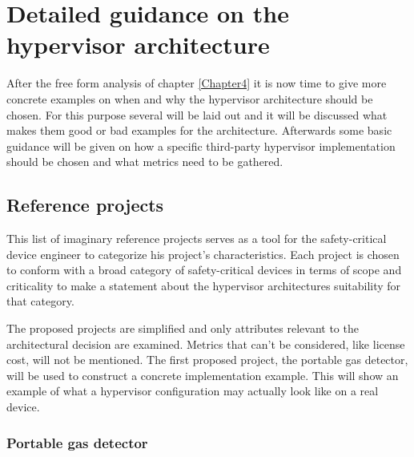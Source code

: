 
\chapter{Detailed guidance on the hypervisor architecture} %

\label{Chapter5} %



After the free form analysis of chapter \ref{Chapter4} it is now time to give more concrete examples on when and why the hypervisor architecture should be chosen. For this purpose several  will be laid out and it will be discussed what makes them good or bad examples for the architecture. Afterwards some basic guidance will be given on how a specific third-party hypervisor implementation should be chosen and what metrics need to be gathered.
\section{Reference projects} \label{ref-projects}
This list of imaginary reference projects serves as a tool for the safety-critical device engineer to categorize his project's characteristics. Each project is chosen to conform with a broad category of safety-critical devices in terms of scope and criticality to make a statement about the hypervisor architectures suitability for that category. 

The proposed projects are simplified and only attributes relevant to the architectural decision are examined. Metrics that can't be considered, like license cost, will not be mentioned. The first proposed project, the portable gas detector, will be used to construct a concrete implementation example. This will show an example of what a hypervisor configuration may actually look like on a real device.

\subsection{Portable gas detector}
